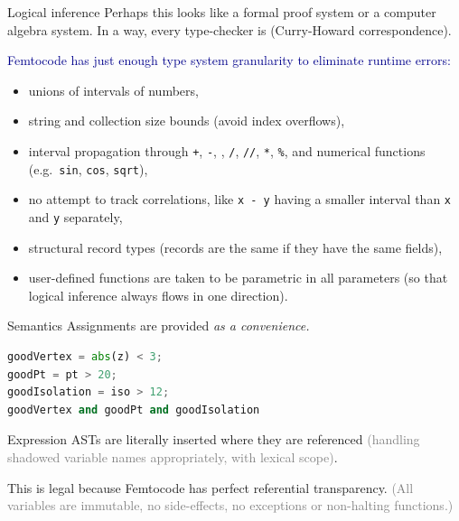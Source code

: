 \documentclass{beamer}
\begin{document}
\begin{frame}{Logical inference}
\vspace{0.25 cm}
Perhaps this looks like a formal proof system or a computer algebra system. In a way, every type-checker is (Curry-Howard correspondence).

\vspace{0.25 cm}
\textcolor{darkblue}{Femtocode has just enough type system granularity to eliminate runtime errors:}
\begin{itemize}
\item unions of intervals of numbers,
\item string and collection size bounds (avoid index overflows),
\item interval propagation through {\tt +}, {\tt -}, {\tt *}, {\tt /}, {\tt //}, {\tt **}, {\tt \%}, and numerical functions (e.g.\ {\tt sin}, {\tt cos}, {\tt sqrt}),
\item no attempt to track correlations, like {\tt x - y} having a smaller interval than {\tt x} and {\tt y} separately,
\item structural record types (records are the same if they have the same fields),
\item user-defined functions are taken to be parametric in all parameters (so that logical inference always flows in one direction).
\end{itemize}
\end{frame}

\begin{frame}[fragile]{Semantics}
\vspace{0.5 cm}
Assignments are provided {\it as a convenience.}

\begin{center}
\begin{minipage}{0.9\linewidth}
\small
\begin{lstlisting}[language=python]
goodVertex = abs(z) < 3;
goodPt = pt > 20;
goodIsolation = iso > 12;
goodVertex and goodPt and goodIsolation
\end{lstlisting}
\end{minipage}
\end{center}

Expression ASTs are literally inserted where they are referenced \textcolor{gray}{(handling shadowed variable names appropriately, with lexical scope)}.

\vspace{0.5 cm}
This is legal because Femtocode has perfect referential transparency. \textcolor{gray}{(All variables are immutable, no side-effects, no exceptions or non-halting functions.)}
\end{frame}
\end{document}
